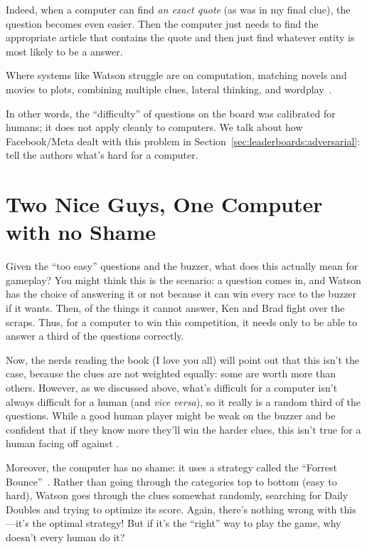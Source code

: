 Indeed, when a computer can find \emph{an exact quote} (as was in my
final \jeopardy{} clue), the question becomes even easier.
%
Then the computer just needs to find the appropriate article that
contains the quote and then just find whatever entity is most likely
to be a \jeopardy{} answer.

Where systems like Watson struggle are on computation, matching novels
and movies to plots, combining multiple clues, lateral thinking, and
wordplay~\citep{kaushik-18}.

In other words, the ``difficulty'' of \jeopardy{} questions on the
board was calibrated for humans; it does not apply cleanly to
computers.
%
We talk about how Facebook/Meta dealt with this problem in
Section~\ref{sec:leaderboards:adversarial}: tell the authors what's hard for a computer.

\section{Two Nice Guys, One Computer with no Shame}
\label{sec:watson:strategy}


Given the ``too easy'' questions and the buzzer, what does this
actually mean for gameplay?
%
You might think this is the scenario: a question comes in, and Watson
has the choice of answering it or not because it can win every race to
the buzzer if it wants.
%
Then, of the things it cannot answer, Ken and Brad fight over the
scraps.
%
Thus, for a computer to win this competition, it needs only to be able
to answer a third of the questions correctly.

Now, the \jeopardy{} nerds reading the book (I love you all) will
point out that this isn't the case, because the clues are not weighted
equally: some are worth more than others.
%
However, as we discussed above, what's difficult for a computer isn't
always difficult for a human (and \textit{vice versa}), so it really
is a random third of the questions.
%
While a good human player might be weak on the buzzer and be confident
that if they know more they'll win the harder clues, this isn't true
for a human facing off against \watson{}.

Moreover, the computer has no shame: it uses a strategy called the
``Forrest Bounce''~\citep[more infamously associated with James Holzhauer
and Arthur Chu]{rogak-20}.
%
Rather than going through the categories top to bottom (easy to hard),
Watson goes through the clues somewhat randomly, searching for Daily
Doubles and trying to optimize its score.
%
Again, there's nothing wrong with this---it's the optimal strategy!
%
But if it's the ``right'' way to play the game, why doesn't every
human do it?

